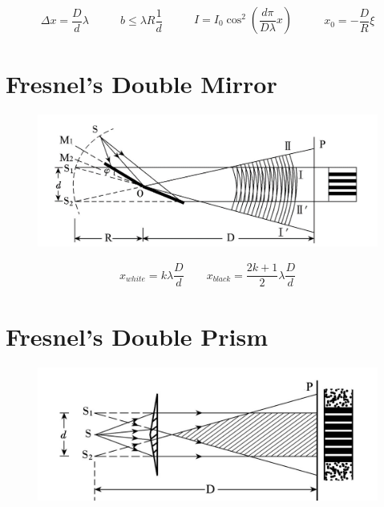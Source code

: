 \begin{equation*}
  \begin{aligned}
    \Delta x = \dfrac{D}{d} \lambda 
  \end{aligned}
  \quad\quad 
  \begin{aligned}
    b \leq \lambda R \dfrac{1}{d} 
  \end{aligned}
  \quad\quad 
  \begin{aligned}
    I = I_0 \cos^2 \left( \dfrac{d \pi}{D \lambda} x  \right)
  \end{aligned}
  \quad\quad 
  \begin{aligned}
    x_0 = - \dfrac{D}{R} \xi
  \end{aligned}
\end{equation*}

\section{Fresnel's Double Mirror}

\begin{figure}[H]
  \centering
  \includegraphics[width=0.9\linewidth]{figures/Fresnel-Double-Mirror}
\end{figure}

\begin{equation*}
  \begin{aligned}
    x_{white} = k \lambda \dfrac{D}{d} \quad\quad x_{black} = \dfrac{2 k + 1}{2} \lambda \dfrac{D}{d}   
  \end{aligned}
\end{equation*}

\section{Fresnel's Double Prism}

\begin{figure}[H]
  \centering
  \includegraphics[width=0.9\linewidth]{figures/Fresnel-double-prism}
\end{figure}

